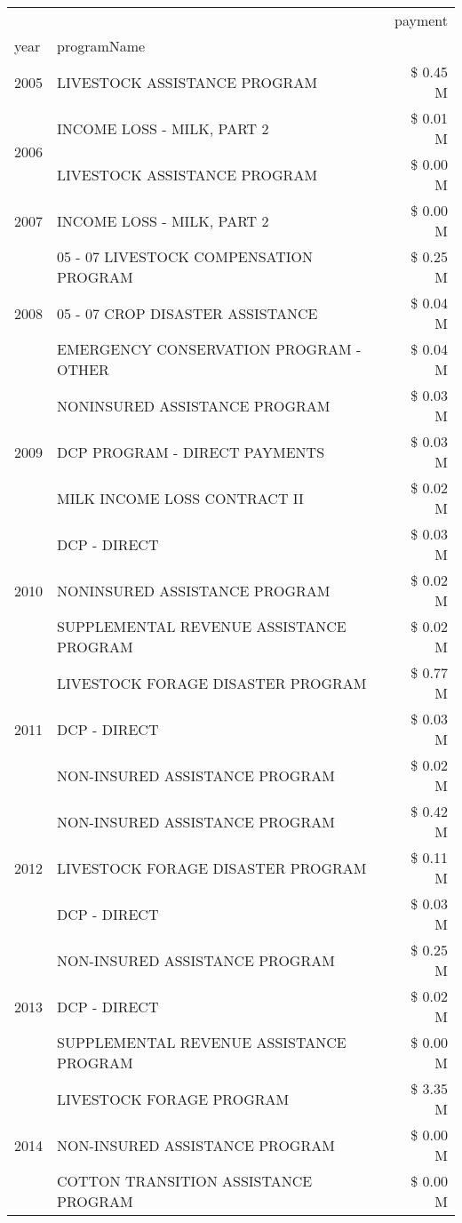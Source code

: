 \begin{tabular}{llr}
\toprule
 &  & payment \\
year & programName &  \\
\midrule
2005 & LIVESTOCK ASSISTANCE PROGRAM & \$ 0.45 M \\
\cline{1-3}
\multirow[t]{2}{*}{2006} & INCOME LOSS - MILK, PART 2 & \$ 0.01 M \\
 & LIVESTOCK ASSISTANCE PROGRAM & \$ 0.00 M \\
\cline{1-3}
2007 & INCOME LOSS - MILK, PART 2 & \$ 0.00 M \\
\cline{1-3}
\multirow[t]{3}{*}{2008} & 05 - 07 LIVESTOCK COMPENSATION PROGRAM & \$ 0.25 M \\
 & 05 - 07 CROP DISASTER ASSISTANCE & \$ 0.04 M \\
 & EMERGENCY CONSERVATION PROGRAM - OTHER & \$ 0.04 M \\
\cline{1-3}
\multirow[t]{3}{*}{2009} & NONINSURED ASSISTANCE PROGRAM & \$ 0.03 M \\
 & DCP PROGRAM - DIRECT PAYMENTS & \$ 0.03 M \\
 & MILK INCOME LOSS CONTRACT II & \$ 0.02 M \\
\cline{1-3}
\multirow[t]{3}{*}{2010} & DCP - DIRECT & \$ 0.03 M \\
 & NONINSURED ASSISTANCE PROGRAM & \$ 0.02 M \\
 & SUPPLEMENTAL REVENUE ASSISTANCE PROGRAM & \$ 0.02 M \\
\cline{1-3}
\multirow[t]{3}{*}{2011} & LIVESTOCK FORAGE DISASTER PROGRAM & \$ 0.77 M \\
 & DCP - DIRECT & \$ 0.03 M \\
 & NON-INSURED ASSISTANCE PROGRAM & \$ 0.02 M \\
\cline{1-3}
\multirow[t]{3}{*}{2012} & NON-INSURED ASSISTANCE PROGRAM & \$ 0.42 M \\
 & LIVESTOCK FORAGE DISASTER PROGRAM & \$ 0.11 M \\
 & DCP - DIRECT & \$ 0.03 M \\
\cline{1-3}
\multirow[t]{3}{*}{2013} & NON-INSURED ASSISTANCE PROGRAM & \$ 0.25 M \\
 & DCP - DIRECT & \$ 0.02 M \\
 & SUPPLEMENTAL REVENUE ASSISTANCE PROGRAM & \$ 0.00 M \\
\cline{1-3}
\multirow[t]{3}{*}{2014} & LIVESTOCK FORAGE PROGRAM & \$ 3.35 M \\
 & NON-INSURED ASSISTANCE PROGRAM & \$ 0.00 M \\
 & COTTON TRANSITION ASSISTANCE PROGRAM & \$ 0.00 M \\

\end{tabular}
